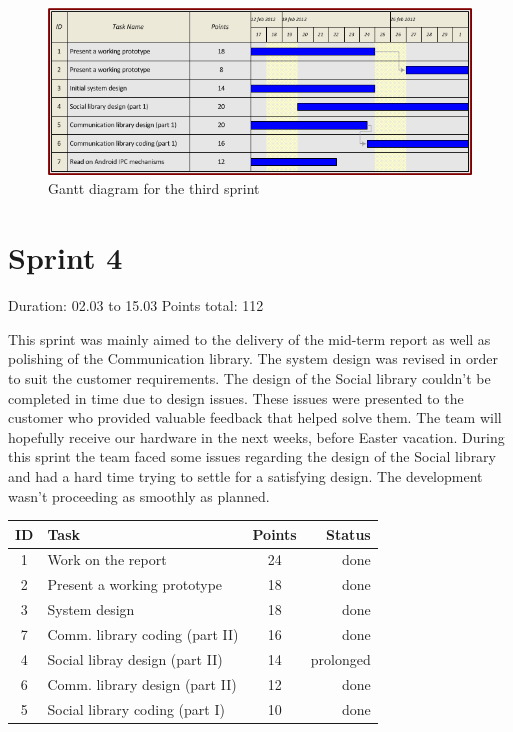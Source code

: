 \begin{figure}[h!]
\centering \includegraphics[scale=0.8]{img/sprints-gantt3.png}
\caption{Gantt diagram for the third sprint}
\label{fig:sprints-gantt3}
\end{figure}

\newpage


\section{Sprint 4}

Duration: 02.03 to 15.03
Points total: 112

This sprint was mainly aimed to the delivery of the mid-term report as well
as polishing of the Communication library. The system design was revised in
order to suit the customer requirements. The design of the Social library couldn't
be completed in time due to design issues. These issues were presented to the
customer who provided valuable feedback that helped solve them. The team will hopefully
receive our hardware in the next weeks, before Easter vacation. During this sprint the team
faced some issues regarding the design of the Social library and had a hard time trying
to settle for a satisfying design. The development wasn't proceeding as smoothly as planned.

\begin{table}[ht!]
\begin{tabular}{ | c | l | c | r | }

\hline
\textbf{ID} & \textbf{Task} & \textbf{Points} & \textbf{Status} \\
\hline

 1 & Work on the report				& 24 & done \\
\hline
 2 & Present a working prototype	& 18 & done \\
\hline
 3 & System design					& 18 & done \\
\hline
 7 & Comm. library coding (part II)	& 16 & done \\
\hline
 4 & Social libray design (part II)	& 14 & prolonged \\
\hline
 6 & Comm. library design (part II)	& 12 & done \\
\hline
 5 & Social library coding (part I)	& 10 & done \\
\hline

\end{tabular}
\end{table}


